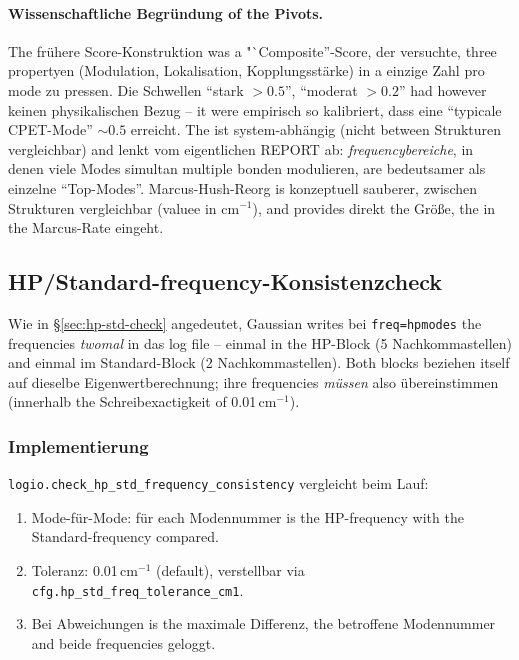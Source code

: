 \documentclass[11pt,a4paper,twoside]{article}
\theoremstyle{remark}
\begin{document}
\paragraph{Wissenschaftliche Begr\"undung of the Pivots.}
The fr\"uhere Score-Konstruktion was a "`Composite''-Score, der
versuchte, three propertyen (Modulation, Lokalisation,
Kopplungsst\"arke) in a einzige Zahl pro mode zu pressen. Die
Schwellen "`stark $> 0.5$"', "`moderat $> 0.2$"' had however keinen
physikalischen Bezug -- it were empirisch so kalibriert, dass eine
"`typicale CPET-Mode"' $\sim 0.5$ erreicht. The ist
system-abh\"angig (nicht between Strukturen vergleichbar) and lenkt
vom eigentlichen REPORT ab: \emph{frequencybereiche}, in denen viele
Modes simultan multiple bonden modulieren, are bedeutsamer als
einzelne "`Top-Modes"'. Marcus-Hush-Reorg is konzeptuell sauberer,
zwischen Strukturen vergleichbar (valuee in cm$^{-1}$), and provides
direkt the Gr\"o{\ss}e, the in the Marcus-Rate eingeht.


\subsection{HP/Standard-frequency-Konsistenzcheck}
\label{sec:hp-std}

Wie in \S\ref{sec:hp-std-check} angedeutet, Gaussian writes
bei \texttt{freq=hpmodes} the frequencies \emph{twomal} in das
log file -- einmal in the HP-Block (5 Nachkommastellen) and einmal im
Standard-Block (2 Nachkommastellen). Both blocks beziehen itself auf
dieselbe Eigenwertberechnung; ihre frequencies \emph{m\"ussen} also
\"ubereinstimmen (innerhalb the Schreibexactigkeit of 0.01\,cm$^{-1}$).

\subsubsection*{Implementierung}

\texttt{logio.check\_hp\_std\_frequency\_consistency} vergleicht beim
Lauf:

\begin{enumerate}
  \item Mode-f\"ur-Mode: f\"ur each Modennummer is the HP-frequency
        with the Standard-frequency compared.
  \item Toleranz: 0.01\,cm$^{-1}$ (default), verstellbar via
        \texttt{cfg.hp\_std\_freq\_tolerance\_cm1}.
  \item Bei Abweichungen is the maximale Differenz, the betroffene
        Modennummer and beide frequencies geloggt.
\end{enumerate}
\end{document}
